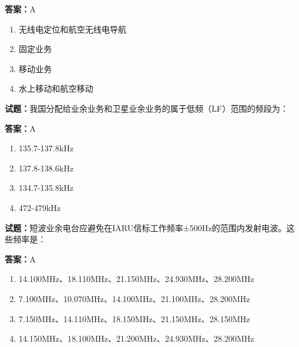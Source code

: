 \documentclass{ctexbook}
\begin{document}
\textbf{答案：}A 

\begin{enumerate}[leftmargin=3em]
  \item 无线电定位和航空无线电导航 

  \item 固定业务 

  \item 移动业务 

  \item 水上移动和航空移动 

\end{enumerate}





\vspace{1em}

\textbf{试题：}我国分配给业余业务和卫星业余业务的属于低频（LF）范围的频段为： 

\textbf{答案：}A 

\begin{enumerate}[leftmargin=3em]
  \item 135.7-137.8kHz 

  \item 137.8-138.6kHz 

  \item 134.7-135.8kHz 

  \item 472-479kHz 

\end{enumerate}





\vspace{1em}

\textbf{试题：}短波业余电台应避免在IARU信标工作频率±500Hz的范围内发射电波。这些频率是： 

\textbf{答案：}A 

\begin{enumerate}[leftmargin=3em]
  \item 14.100MHz、18.110MHz、21.150MHz、24.930MHz、28.200MHz 

  \item 7.100MHz、10.070MHz、14.100MHz、21.100MHz、28.200MHz 

  \item 7.150MHz、14.110MHz、18.150MHz、21.150MHz、28.150MHz 

  \item 14.150MHz、18.100MHz、21.200MHz、24.930MHz、28.200MHz 

\end{enumerate}
\end{document}
